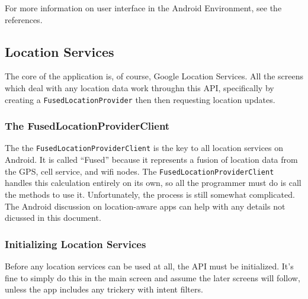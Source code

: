 For more information on user interface in the Android Environment, see the references.\cite{gestureDetector}

\subsection{Location Services}
The core of the application is, of course, Google Location Services. All the screens which deal with any location data work throughn this API, specifically by creating a
\verb|FusedLocationProvider| then then requesting location updates.

\subsubsection{The FusedLocationProviderClient}
The the \verb|FusedLocationProviderClient| is the key to all location services on Android. It is called ``Fused'' because it represents a fusion of location data from the GPS,
cell service, and wifi nodes. The \verb|FusedLocationProviderClient| handles this calculation entirely on its own, so all the programmer must do is call the methods to use it.
Unfortunately, the process is still somewhat complicated. The Android discussion on location-aware apps can help with any details not dicussed in this document.\cite{googleLocationServices}

\subsubsection{Initializing Location Services}
Before any location services can be used at all, the API must be initialized. It's fine to simply do this in the main screen and assume the later screens will follow, unless
the app includes any trickery with intent filters.

